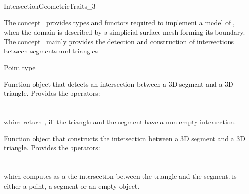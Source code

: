 \ccRefPageBegin


\begin{ccRefConcept}{IntersectionGeometricTraits_3}


\ccDefinition
  
The concept \ccRefName\ provides  types and functors
required to implement a model of ,
when the domain is described  by a simplicial surface mesh
forming its boundary.
The concept \ccRefName\  mainly provides  the detection 
and construction of intersections between segments and triangles.





\ccTypes
{} {Point type.}
\ccGlue
{}
\ccGlue
{}

{Function object that detects an intersection between a 3D segment and a 3D triangle.
Provides the operators: \\
 \\
 \\
which return , iff the triangle and the segment
have a non empty intersection.}

{Function object that constructs the intersection
between a 3D segment and a 3D triangle.
Provides the operators: \\
 \\
 \\
which computes as a 
the intersection between  the triangle and the segment.
 is  either a point, a segment or 
an empty object.}



\end{ccRefConcept}
